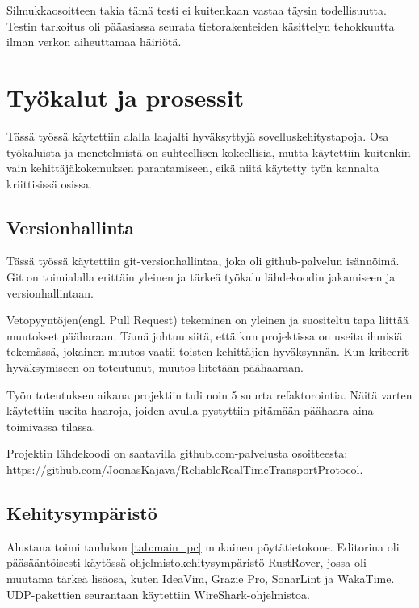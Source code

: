 \documentclass[a4paper,12pt]{article}
\begin{document}
Silmukkaosoitteen takia tämä testi ei kuitenkaan vastaa täysin todellisuutta.
Testin tarkoitus oli pääasiassa seurata tietorakenteiden käsittelyn tehokkuutta ilman
verkon aiheuttamaa häiriötä.


    \section{Työkalut ja prosessit}
    Tässä työssä käytettiin alalla laajalti hyväksyttyjä sovelluskehitystapoja. Osa työkaluista ja menetelmistä on suhteellisen kokeellisia, mutta käytettiin kuitenkin vain kehittäjäkokemuksen parantamiseen, eikä niitä käytetty työn kannalta kriittisissä osissa.

    \subsection{Versionhallinta}
    Tässä työssä käytettiin git-versionhallintaa, joka oli github-palvelun isännöimä. Git on toimialalla erittäin yleinen ja tärkeä työkalu lähdekoodin jakamiseen ja versionhallintaan. \par

    Vetopyyntöjen(engl. Pull Request) tekeminen on yleinen ja suositeltu tapa liittää muutokset pääharaan. Tämä johtuu siitä, että kun projektissa on useita ihmisiä tekemässä, jokainen muutos vaatii toisten kehittäjien hyväksynnän. Kun kriteerit hyväksymiseen on toteutunut,
    muutos liitetään päähaaraan.\par

    Työn toteutuksen aikana projektiin tuli noin 5 suurta refaktorointia.
    Näitä varten käytettiin useita haaroja, joiden avulla pystyttiin pitämään päähaara aina toimivassa tilassa. \par

    Projektin lähdekoodi on saatavilla github.com-palvelusta osoitteesta:
    https://github.com/JoonasKajava/ReliableRealTimeTransportProtocol.

    \subsection{Kehitysympäristö}


    Alustana toimi taulukon \ref{tab:main_pc} mukainen pöytätietokone.
    Editorina oli pääsääntöisesti käytössä ohjelmistokehitysympäristö RustRover, jossa oli muutama tärkeä lisäosa, kuten IdeaVim, Grazie Pro, SonarLint ja WakaTime.
    UDP-pakettien seurantaan käytettiin WireShark-ohjelmistoa.
\end{document}
